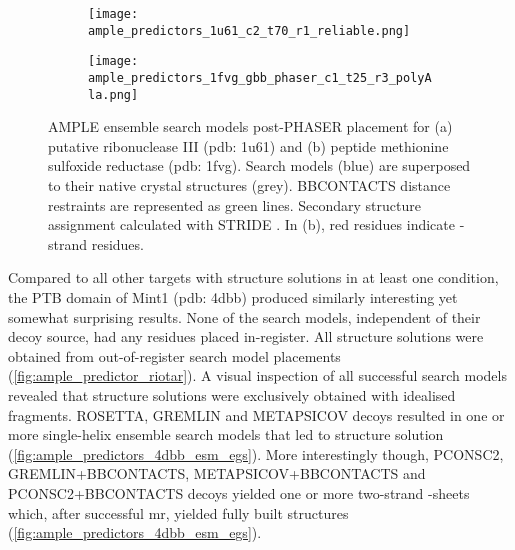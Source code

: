 \begin{figure}[H]
    \begin{subfigure}[b]{0.49\textwidth}
        \centering
        \texttt{[image: ample\_predictors\_1u61\_c2\_t70\_r1\_reliable.png]}
        \caption{}
        \label{fig:ample_predictors_1u61_c2_t70_r1_reliable}
    \end{subfigure}
    \begin{subfigure}[b]{0.49\textwidth}
        \centering
        \texttt{[image: ample\_predictors\_1fvg\_gbb\_phaser\_c1\_t25\_r3\_polyAla.png]}
        \caption{}
        \label{fig:ample_predictors_1fvg_gbb_phaser_c1_t25_r3_polyAla}
    \end{subfigure}
    \caption[Examples of successfully placed AMPLE search models]{AMPLE ensemble search models post-PHASER placement for (a) putative ribonuclease III (\gls{pdb}: 1u61) and (b) peptide methionine sulfoxide reductase (\gls{pdb}: 1fvg). Search models (blue) are superposed to their native crystal structures (grey). BBCONTACTS distance restraints are represented as green lines. Secondary structure assignment calculated with STRIDE \cite{Frishman1995-si}. In (b), red residues indicate \textbeta-strand residues.}
\end{figure}

Compared to all other targets with structure solutions in at least one condition, the PTB domain of Mint1 (\gls{pdb}: 4dbb) produced similarly interesting yet somewhat surprising results. None of the search models, independent of their decoy source, had any residues placed in-register. All structure solutions were obtained from out-of-register search model placements (\cref{fig:ample_predictor_riotar}). A visual inspection of all successful search models revealed that structure solutions were exclusively obtained with idealised fragments. ROSETTA, GREMLIN and METAPSICOV decoys resulted in one or more single-helix ensemble search models that led to structure solution (\cref{fig:ample_predictors_4dbb_esm_egs}). More interestingly though, PCONSC2, GREMLIN+BBCONTACTS, METAPSICOV+BBCONTACTS and PCONSC2+BBCONTACTS decoys yielded one or more two-strand \textbeta-sheets which, after successful \gls{mr}, yielded fully built structures (\cref{fig:ample_predictors_4dbb_esm_egs}).

